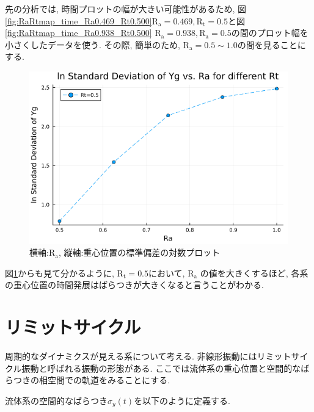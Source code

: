 \vspace{1\baselineskip}

先の分析では, 時間プロットの幅が大きい可能性があるため, 図\ref{fig:RaRtmap_time_Ra0.469_Rt0.500}$\text{R}_\text{a} = 0.469, \text{R}_\text{t} = 0.5$と図\ref{fig:RaRtmap_time_Ra0.938_Rt0.500} $\text{R}_\text{a} = 0.938, \text{R}_\text{a} = 0.5$の間のプロット幅を小さくしたデータを使う. その際, 簡単のため, $\text{R}_\text{a} =0.5 \sim 1.0$の間を見ることにする.



\begin{figure}[H]
  \centering
  \includegraphics[scale=0.5]{image/lnStdYg_Ra0.5to1.0_Rt0.5_ti25000.png}
  \caption{横軸:$\text{R}_\text{a}$, 縦軸:重心位置の標準偏差の対数プロット}
  \label{fig:lnStdYg_Ra0.5to1.0_Rt0.5_ti25000}
\end{figure}

図\ref{fig:lnStdYg_Ra0.5to1.0_Rt0.5_ti25000}からも見て分かるように, $\text{R}_\text{t} = 0.5$において, $\text{R}_\text{a}$ の値を大きくするほど, 各系の重心位置の時間発展はばらつきが大きくなると言うことがわかる.

\section{リミットサイクル}\label{sec:limitcycle}

周期的なダイナミクスが見える系について考える. 非線形振動にはリミットサイクル振動\cite{Rhythm}と呼ばれる振動の形態がある. ここでは流体系の重心位置と空間的なばらつきの相空間での軌道をみることにする.

流体系の空間的なばらつき$\sigma_{y} (t)$を以下のように定義する.

